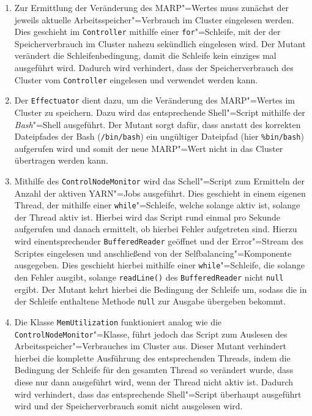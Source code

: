 \begin{enumerate}
    \item
    Zur Ermittlung der Veränderung des \ac{MARP}"=Wertes muss zunächst der jeweils aktuelle Arbeitsspeicher"=Verbrauch im Cluster eingelesen werden.
    Dies geschieht im \texttt{Controller} mithilfe einer \texttt{for}"=Schleife, mit der der Speicherverbrauch im Cluster nahezu sekündlich eingelesen wird.
    Der Mutant verändert die Schleifenbedingung, damit die Schleife kein einziges mal ausgeführt wird.
    Dadurch wird verhindert, dass der Speicherverbrauch des Cluster vom \texttt{Controller} eingelesen und verwendet werden kann.
    
    \item 
    Der \texttt{Effectuator} dient dazu, um die Veränderung des \ac{MARP}"=Wertes im Cluster zu speichern.
    Dazu wird das entsprechende Shell"=Script mithilfe der \emph{Bash}"=Shell ausgeführt.
    Der Mutant sorgt dafür, dass anstatt des korrekten Dateipfades der Bash (\texttt{/bin/bash}) ein ungültiger Dateipfad (hier \texttt{\%bin/bash}) aufgerufen wird und somit der neue \ac{MARP}"=Wert nicht in das Cluster übertragen werden kann.
    
    \item
    Mithilfe des \texttt{ControlNodeMonitor} wird das Schell"=Script zum Ermitteln der Anzahl der aktiven \ac{YARN}"=Jobs ausgeführt.
    Dies geschieht in einem eigenen Thread, der mithilfe einer \texttt{while}"=Schleife, welche solange aktiv ist, solange der Thread aktiv ist.
    Hierbei wird das Script rund einmal pro Sekunde aufgerufen und danach ermittelt, ob hierbei Fehler aufgetreten sind. Hierzu wird einentsprechender \texttt{BufferedReader} geöffnet und der Error"=Stream des Scriptes eingelesen und anschließend von der Selfbalancing"=Komponente ausgegeben.
    Dies geschieht hierbei mithilfe einer \texttt{while}"=Schleife, die solange den Fehler ausgibt, solange \texttt{readLine()} des \texttt{BufferedReader} nicht \texttt{null} ergibt.
    Der Mutant kehrt hierbei die Bedingung der Schleife um, sodass die in der Schleife enthaltene Methode \texttt{null} zur Ausgabe übergeben bekommt.
    
    \item
    Die Klasse \texttt{MemUtilization} funktioniert analog wie die \texttt{ControlNodeMonitor}"=Klasse, führt jedoch das Script zum Auslesen des Arbeitsspeicher"=Verbrauches im Cluster aus.
    Dieser Mutant verhindert hierbei die komplette Ausführung des entsprechenden Threads, indem die Bedingung der Schleife für den gesamten Thread so verändert wurde, dass diese nur dann ausgeführt wird, wenn der Thread nicht aktiv ist.
    Dadurch wird verhindert, dass das entsprechende Shell"=Script überhaupt ausgeführt wird und der Speicherverbrauch somit nicht ausgelesen wird.
\end{enumerate}

